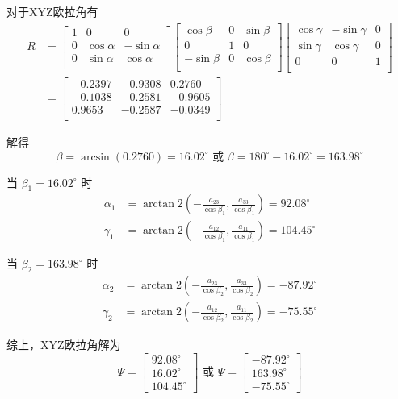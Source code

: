 \documentclass[UTF8, 12pt]{ctexart}
\begin{document}
对于XYZ欧拉角有
\[
\begin{aligned}
    R &= \begin{bmatrix}
        1 & 0 & 0 \\
        0 & \cos\alpha & -\sin\alpha \\
        0 & \sin\alpha & \cos\alpha \\
        \end{bmatrix}
        \begin{bmatrix}
        \cos\beta & 0 & \sin\beta \\
        0 & 1 & 0 \\
        -\sin\beta & 0 & \cos\beta \\
        \end{bmatrix}
        \begin{bmatrix}
        \cos\gamma & -\sin\gamma & 0 \\
        \sin\gamma & \cos\gamma & 0 \\
        0 & 0 & 1 \\
        \end{bmatrix} \\
        &= \begin{bmatrix}
        -0.2397 & -0.9308 & 0.2760 \\
        -0.1038 & -0.2581 & -0.9605 \\
        0.9653 & -0.2587 & -0.0349 \\
        \end{bmatrix}
\end{aligned}
\]

解得
\[
\beta = \arcsin(0.2760) = 16.02^\circ \text{ 或 } \beta = 180^\circ - 16.02^\circ = 163.98^\circ
\]

当 $\beta_1 = 16.02^\circ$ 时
\[
\begin{aligned}
    \alpha_1 &= \arctan2\left(-\frac{a_{23}}{\cos\beta_1}, \frac{a_{33}}{\cos\beta_1}\right) = 92.08^\circ \\
    \gamma_1 &= \arctan2\left(-\frac{a_{12}}{\cos\beta_1}, \frac{a_{11}}{\cos\beta_1}\right) = 104.45^\circ
\end{aligned}
\]

当 $\beta_2 = 163.98^\circ$ 时
\[
\begin{aligned}
    \alpha_2 &= \arctan2\left(-\frac{a_{23}}{\cos\beta_2}, \frac{a_{33}}{\cos\beta_2}\right) = -87.92^\circ \\
    \gamma_2 &= \arctan2\left(-\frac{a_{12}}{\cos\beta_2}, \frac{a_{11}}{\cos\beta_2}\right) = -75.55^\circ
\end{aligned}
\]

综上，XYZ欧拉角解为
\[
\Psi = \begin{bmatrix}
        92.08^\circ \\ 16.02^\circ \\ 104.45^\circ
        \end{bmatrix} 
        \text{ 或 } 
\Psi = \begin{bmatrix}
        -87.92^\circ \\ 163.98^\circ \\ -75.55^\circ
        \end{bmatrix}
\]
\end{document}
